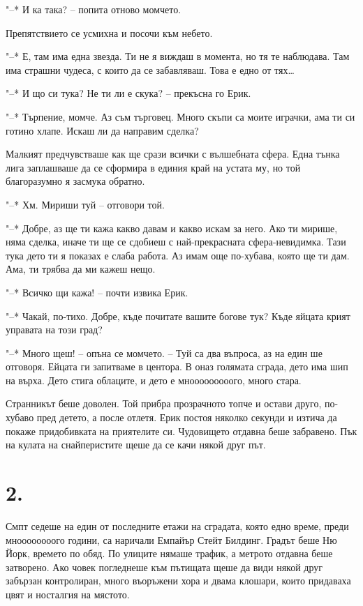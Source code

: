 \documentclass[ebook,openany,12pt]{memoir}
\begin{document}
"--* И ка така? – попита отново момчето.

Препятствието се усмихна и посочи към небето.

"--* Е, там има една звезда. Ти не я виждаш в момента, но тя те наблюдава. Там има страшни чудеса, с които да се забавляваш. Това е едно от тях\ldots

"--* И що си тука? Не ти ли е скука? – прекъсна го Ерик.

"--* Търпение, момче. Аз съм търговец. Много скъпи са моите играчки, ама ти си готино хлапе. Искаш ли да направим сделка?

Малкият предчувстваше как ще срази всички с вълшебната сфера. Една тънка лига заплашваше да се сформира в единия край на устата му, но той благоразумно я засмука обратно.

"--* Хм. Мириши туй – отговори той.

"--* Добре, аз ще ти кажа какво давам и какво искам за него. Ако ти мирише, няма сделка, иначе ти ще се сдобиеш с най-прекрасната сфера-невидимка. Тази тука дето ти я показах е слаба работа. Аз имам още по-хубава, която ще ти дам. Ама, ти трябва да ми кажеш нещо.

"--* Всичко щи кажа! – почти извика Ерик.

"--* Чакай, по-тихо. Добре, къде почитате вашите богове тук? Къде яйцата крият управата на този град?

"--* Много щеш! – опъна се момчето. – Туй са два въпроса, аз на един ше отговоря. Ейцата ги запитваме в центора. В оназ голямата сграда, дето има шип на върха. Дето стига облаците, и дето е мнооооооооого, много стара.

Странникът беше доволен. Той прибра прозрачното топче и остави друго, по-хубаво пред детето, а после отлетя. Ерик постоя няколко секунди и изтича да покаже придобивката на приятелите си. Чудовището отдавна беше забравено. Пък на кулата на снайперистите щеше да се качи някой друг път.

\section*{2.}

Смпт седеше на един от последните етажи на сградата, която едно време, преди мноооооооого години, са наричали Емпайър Стейт Билдинг. Градът беше Ню Йорк, времето по обяд. По улиците нямаше трафик, а метрото отдавна беше затворено. Ако човек погледнеше към пътищата щеше да види някой друг забързан контролиран, много въоръжени хора и двама клошари, които придаваха цвят и носталгия на мястото.
\end{document}

